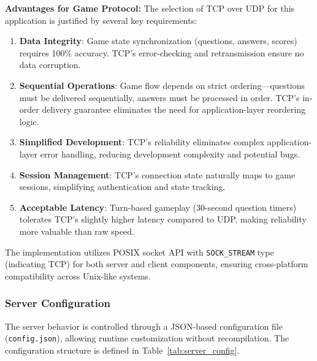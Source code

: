 \textbf{Advantages for Game Protocol:}
The selection of TCP over UDP for this application is justified by several key requirements:
\begin{enumerate}
    \item \textbf{Data Integrity}: Game state synchronization (questions, answers, scores) requires 100\% accuracy. TCP's error-checking and retransmission ensure no data corruption.
    \item \textbf{Sequential Operations}: Game flow depends on strict ordering—questions must be delivered sequentially, answers must be processed in order. TCP's in-order delivery guarantee eliminates the need for application-layer reordering logic.
    \item \textbf{Simplified Development}: TCP's reliability eliminates complex application-layer error handling, reducing development complexity and potential bugs.
    \item \textbf{Session Management}: TCP's connection state naturally maps to game sessions, simplifying authentication and state tracking.
    \item \textbf{Acceptable Latency}: Turn-based gameplay (30-second question timers) tolerates TCP's slightly higher latency compared to UDP, making reliability more valuable than raw speed.
\end{enumerate}

The implementation utilizes POSIX socket API with \texttt{SOCK\_STREAM} type (indicating TCP) for both server and client components, ensuring cross-platform compatibility across Unix-like systems.

\subsubsection{Server Configuration}

The server behavior is controlled through a JSON-based configuration file (\texttt{config.json}), allowing runtime customization without recompilation. The configuration structure is defined in Table~\ref{tab:server_config}.

